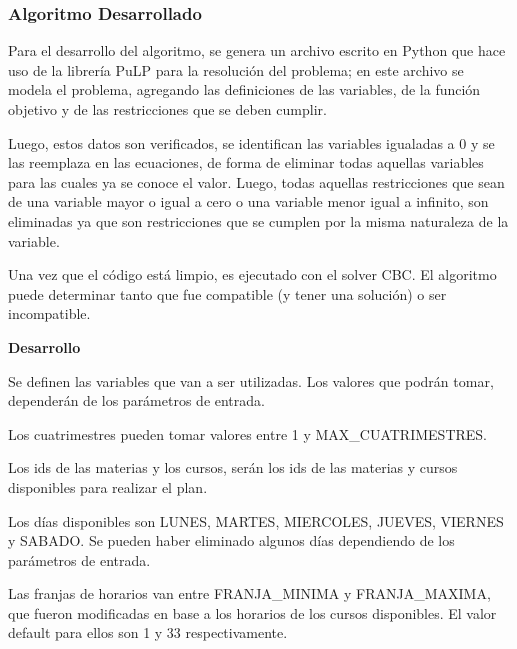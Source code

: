 \documentclass[a4paper]{article}
\begin{document}
\subsubsection{Algoritmo Desarrollado}

Para el desarrollo del algoritmo, se genera un archivo escrito en Python que hace uso de la librería PuLP para la resolución del problema; en este archivo se modela el problema, agregando las definiciones de las variables, de la función objetivo y de las restricciones que se deben cumplir.

Luego, estos datos son verificados, se identifican las variables igualadas a 0 y se las reemplaza en las ecuaciones, de forma de eliminar todas aquellas variables para las cuales ya se conoce el valor. Luego, todas aquellas restricciones que sean de una variable mayor o igual a cero o una variable menor igual a infinito, son eliminadas ya que son restricciones que se cumplen por la misma naturaleza de la variable.

Una vez que el código está limpio, es ejecutado con el solver CBC. El algoritmo puede determinar tanto que fue compatible (y tener una solución) o ser incompatible.\newline

\textbf{Desarrollo}\newline

Se definen las variables que van a ser utilizadas. Los valores que podrán tomar, dependerán de los parámetros de entrada.\newline

Los cuatrimestres pueden tomar valores entre 1 y MAX\_CUATRIMESTRES.

Los ids de las materias y los cursos, serán los ids de las materias y cursos disponibles para realizar el plan.\newline

Los días disponibles son LUNES, MARTES, MIERCOLES, JUEVES, VIERNES y SABADO. Se pueden haber eliminado algunos días dependiendo de los parámetros de entrada.\newline

Las franjas de horarios van entre FRANJA\_MINIMA y FRANJA\_MAXIMA, que fueron modificadas en base a los horarios de los cursos disponibles. El valor default para ellos son 1 y 33 respectivamente.
\end{document}
